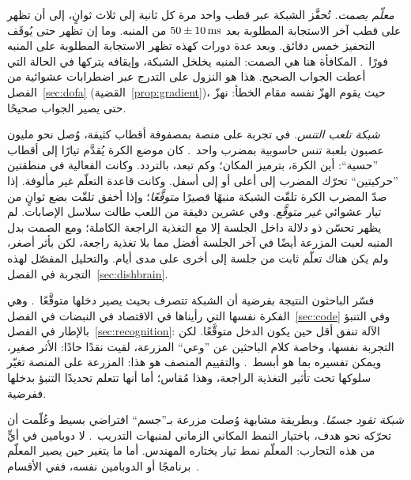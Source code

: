 \emph{معلّم يصمت.} تُحفَّز الشبكة عبر قطب واحد مرة كل ثانية إلى ثلاث ثوانٍ، إلى أن تظهر على قطب آخر الاستجابة المطلوبة بعد $50\pm10\,\text{ms}$ من المنبه. وما إن تظهر حتى يُوقَف التحفيز خمس دقائق. وبعد عدة دورات كهذه تظهر الاستجابة المطلوبة على المنبه فورًا~\cite{Shahaf2001}. المكافأة هنا هي الصمت: المنبه يخلخل الشبكة، وإيقافه يتركها في الحالة التي أعطت الجواب الصحيح. هذا هو النزول على التدرج عبر اضطرابات عشوائية من الفصل~\ref{sec:dofa} (القضية~\ref{prop:gradient})، حيث يقوم الهزّ نفسه مقام الخطأ: نهزّ حتى يصير الجواب صحيحًا.

\emph{شبكة تلعب التنس.} في تجربة على منصة بمصفوفة أقطاب كثيفة، وُصل نحو مليون عصبون بلعبة تنس حاسوبية بمضرب واحد~\cite{Kagan2022}. كان موضع الكرة يُقدَّم تيارًا إلى أقطاب ”حسية“: أين الكرة، بترميز المكان؛ وكم تبعد، بالتردد. وكانت الفعالية في منطقتين ”حركيتين“ تحرّك المضرب إلى أعلى أو إلى أسفل. وكانت قاعدة التعلّم غير مألوفة. إذا صدّ المضرب الكرة تلقّت الشبكة منبهًا قصيرًا \emph{متوقَّعًا}؛ وإذا أخفق تلقّت بضع ثوانٍ من تيار عشوائي \emph{غير متوقَّع}. وفي عشرين دقيقة من اللعب طالت سلاسل الإصابات. لم يظهر تحسّن ذو دلالة داخل الجلسة إلا مع التغذية الراجعة الكاملة؛ ومع الصمت بدل المنبه لعبت المزرعة أيضًا في آخر الجلسة أفضل مما بلا تغذية راجعة، لكن بأثر أصغر، ولم يكن هناك تعلّم ثابت من جلسة إلى أخرى على مدى أيام. والتحليل المفصّل لهذه التجربة في الفصل~\ref{sec:dishbrain}.

فسّر الباحثون النتيجة بفرضية أن الشبكة تتصرف بحيث يصير دخلها متوقَّعًا~\cite{Friston2010}. وهي الفكرة نفسها التي رأيناها في الاقتصاد في النبضات في الفصل~\ref{sec:code} وفي التنبؤ بالإطار في الفصل~\ref{sec:recognition}: الآلة تنفق أقل حين يكون الدخل متوقَّعًا. لكن التجربة نفسها، وخاصة كلام الباحثين عن ”وعي“ المزرعة، لقيت نقدًا حادًا: الأثر صغير، ويمكن تفسيره بما هو أبسط~\cite{Balci2023}. والتقييم المنصف هو هذا: المزرعة على المنصة تغيّر سلوكها تحت تأثير التغذية الراجعة، وهذا مُقاس؛ أما أنها تتعلم تحديدًا التنبؤ بدخلها ففرضية.

\emph{شبكة تقود جسمًا.} وبطريقة مشابهة وُصلت مزرعة بـ”جسم“ افتراضي بسيط وعُلّمت أن تحرّكه نحو هدف، باختيار النمط المكاني الزماني لمنبهات التدريب~\cite{Bakkum2008}. لا دوبامين في أيٍّ من هذه التجارب: المعلّم نمط تيار يختاره المهندس. أما ما يتغير حين يصير المعلّم برنامجًا أو الدوبامين نفسه، ففي الأقسام~\babelsublr{\ref{sec:dishdopamine}--\ref{sec:cartpole}}.

